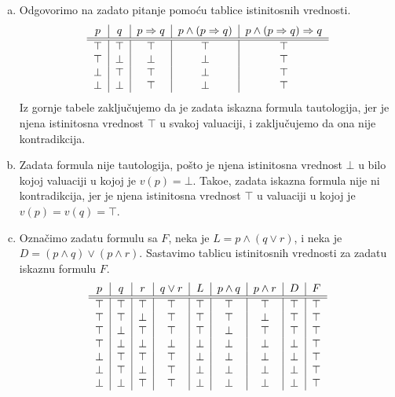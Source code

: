 \begin{enumerate}[(a)]
Po\v sto je zadataka iskazna formula tautologija, ona nije kontradikcija.

\item Odgovorimo na zadato pitanje pomo\' cu tablice istinitosnih vrednosti. 
\[\begin{tabular}{c|c|c|c|c}
$p$ & $q$ & $p\Rightarrow q$ & $p\wedge (p\Rightarrow q)$ & $p\wedge(p\Rightarrow q)\Rightarrow q$\\
\hline\hline
$\top$ & $\top$ & $\top$ & $\top$ & $\top$\\
$\top$ & $\bot$ & $\bot$ & $\bot$ & $\top$\\
$\bot$ & $\top$ & $\top$ & $\bot$ & $\top$\\
$\bot$ & $\bot$ & $\top$ & $\bot$ & $\top$\\
\end{tabular}\]
Iz gornje tabele zaklju\v cujemo da je zadata iskazna formula tautologija, jer je njena istinitosna vrednost $\top$ u svakoj valuaciji, i zaklju\v cujemo da ona nije kontradikcija.
\item Zadata formula nije tautologija, po\v sto je njena istinitosna vrednost $\bot$ u bilo kojoj valuaciji u kojoj je $v(p)=\bot$. Tako\dj e, zadata iskazna formula nije ni kontradikcija, jer je njena istinitosna vrednost $\top$ u valuaciji  u kojoj je $v(p)=v(q)=\top$.
\item Ozna\v cimo zadatu formulu sa $F$, neka je $L=p\wedge(q\vee r)$, i neka je $D= (p\wedge q)\vee(p\wedge r)$. Sastavimo tablicu istinitosnih vrednosti za zadatu iskaznu formulu $F$.
\[\begin{tabular}{c|c|c|c|c|c|c|c|c}
$p$ & $q$ & $r$ & $q\vee r$ & $L$ & $p\wedge q$ & $p\wedge r$ & $ D$ & $F$\\
\hline\hline
$\top$ & $\top$ & $\top$ & $\top$ & $\top$ & $\top$ & $\top$ & $\top$ & $\top$\\
$\top$ & $\top$ & $\bot$ & $\top$ & $\top$ & $\top$ & $\bot$ & $\top$ & $\top$\\
$\top$ & $\bot$ & $\top$ & $\top$ & $\top$ & $\bot$ & $\top$ & $\top$ & $\top$\\
$\top$ & $\bot$ & $\bot$ & $\bot$ & $\bot$ & $\bot$ & $\bot$ & $\bot$ & $\top$\\
$\bot$ & $\top$ & $\top$ & $\top$ & $\bot$ & $\bot$ & $\bot$ & $\bot$ & $\top$\\
$\bot$ & $\top$ & $\bot$ & $\top$ & $\bot$ & $\bot$ & $\bot$ & $\bot$ & $\top$\\
$\bot$ & $\bot$ & $\top$ & $\top$ & $\bot$ & $\bot$ & $\bot$ & $\bot$ & $\top$\\

\end{tabular}\]
\end{enumerate}
